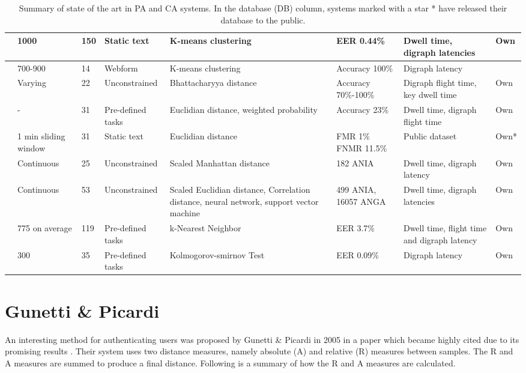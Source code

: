 \documentclass[informationsecurity]{gucmasterproject}
\begin{document}
\begin{table}[h]
{\begin{tabular}{ |l|p{2.1cm}|l|p{2.15cm}|p{3cm}|p{2.3cm}|p{2.5cm}|l| }
 \cite{KIM2017} & 1000 & 150 & Static text & K-means clustering & EER 0.44\% & Dwell time, digraph latencies & Own \\ \hline
 \cite{Solami} & 700-900 & 14 & Webform & K-means clustering & Accuracy 100\% & Digraph latency & \cite{gnp}\\ \hline
 \cite{Janakiraman2007} & Varying & 22 & Unconstrained & Bhattacharyya distance & Accuracy 70\%-100\% & Digraph flight time, key dwell time & Own\\ \hline
 \cite{Monrose} & - & 31 & Pre-defined tasks & Euclidian distance, weighted probability & Accuracy 23\% & Dwell time, digraph flight time & Own\\ \hline
 \cite{sliding} & 1 min sliding window & 31 & Static text & Euclidian distance & FMR 1\% FNMR 11.5\% & Public dataset & Own*\\ \hline
 \cite{BOURS201236} & Continuous & 25 & Unconstrained & Scaled Manhattan distance & 182 ANIA & Dwell time, digraph latency & Own\\ \hline
 \cite{mondal} & Continuous & 53 & Unconstrained & Scaled Euclidian distance, Correlation distance, neural network, support vector machine & 499 ANIA, 16057 ANGA & Dwell time, digraph latencies & Own \\ \hline
 \cite{monaco} & 775 on average & 119 & Pre-defined tasks & k-Nearest Neighbor & EER 3.7\% & Dwell time, flight time and digraph latency & Own \\ \hline
 \cite{park} & 300 & 35 & Pre-defined tasks & Kolmogorov-smirnov Test & EER 0.09\% & Digraph latency & Own \\ \hline

\end{tabular}
}
\caption{Summary of state of the art in PA and CA systems. In the database (DB) column, systems marked with a star * have released their database to the public.}
\end{table}



\chapter{Gunetti \& Picardi}
\label{chap:gnp}
An interesting method for authenticating users was proposed by Gunetti \& Picardi in 2005 in a paper which became highly cited due to its promising results \cite{gnp}.
Their system uses two distance measures, namely absolute (A) and relative (R) measures between samples.
The R and A measures are summed to produce a final distance.
Following is a summary of how the R and A measures are calculated.
\end{document}
